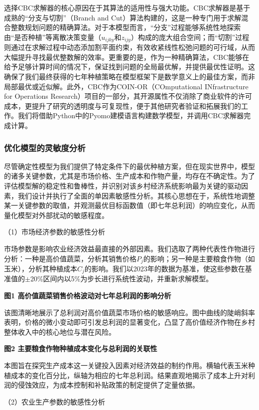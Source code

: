 \documentclass[withoutpreface,bwprint]{cumcmthesis} %
\begin{document}
选择CBC求解器的核心原因在于其算法的适用性与强大功能。CBC求解器是基于成熟的“分支与切割”（Branch and Cut）算法构建的，这是一种专门用于求解混合整数规划问题的精确算法。对于本模型而言，“分支”过程能够系统性地探索由“是否种植”等离散决策变量（$u_{ijky}$和$z_{ijy}$）构成的庞大组合空间；而“切割”过程则通过在求解过程中动态添加割平面约束，有效收紧线性松弛问题的可行域，从而大幅提升寻找最优整数解的效率。更重要的是，作为一种精确算法，CBC能够在给予足够计算时间的情况下，保证找到问题的全局最优解，并提供最优性证明。这确保了我们最终获得的七年种植策略在模型框架下是数学意义上的最佳方案，而非局部最优或近似解。此外，CBC作为COIN-OR（COmputational INfrastructure for Operations Research）项目的一部分，其开源属性不仅消除了商业软件的许可成本，更提升了研究的透明度与可复现性，便于其他研究者验证和拓展我们的工作。我们将借助Python中的Pyomo建模语言构建数学模型，并调用CBC求解器完成计算。

\subsubsection{优化模型的灵敏度分析}
尽管确定性模型为我们提供了特定条件下的最优种植方案，但在现实世界中，模型的诸多关键参数，尤其是市场价格、生产成本和作物产量，均存在不确定性。为了评估模型解的稳定性和鲁棒性，并识别对该乡村经济系统影响最为关键的驱动因素，我们设计并执行了全面的单因素敏感性分析。其核心思想在于，系统性地调整某一关键参数的取值，并观测最优目标函数值（即七年总利润）的响应变化，从而量化模型对外部扰动的敏感程度。


（1）市场经济参数的敏感性分析

市场参数是影响农业经济效益最直接的外部因素。我们选取了两种代表性作物进行分析：一种是高价值蔬菜，分析其销售价格$P_j$的影响；另一种是主要粮食作物（如玉米），分析其种植成本$C_j$的影响。我们以2023年的数据为基准，使这些参数在基准值的$\pm$20\%区间内以5\%为步长进行系统性波动，并重新求解模型。

\textbf{图1 高价值蔬菜销售价格波动对七年总利润的影响分析}

该图清晰地展示了总利润对高价值蔬菜市场价格的敏感响应。图中曲线的陡峭斜率表明，价格的微小变动即可引发总利润的显著变化，凸显了高价值经济作物在乡村整体收入中的核心地位与潜在风险。

\textbf{图2 主要粮食作物种植成本变化与总利润的关联性}

本图旨在探究生产成本这一关键投入因素对经济效益的制约作用。横轴代表玉米种植成本的变化百分比，纵轴为相应的七年总利润。结果直观地揭示了成本上升对利润的侵蚀效应，为成本控制和补贴政策的制定提供了定量依据。

（2）农业生产参数的敏感性分析
\end{document}
